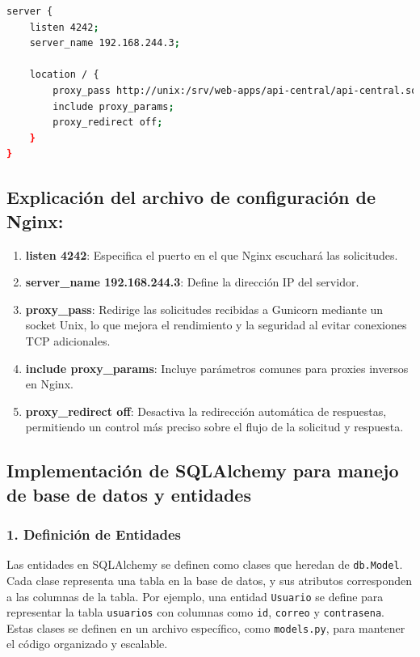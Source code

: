 \begin{lstlisting}[language=bash, caption={Archivo de configuración de Nginx.}]
server {
    listen 4242;
    server_name 192.168.244.3;

    location / {
        proxy_pass http://unix:/srv/web-apps/api-central/api-central.sock;
        include proxy_params;
        proxy_redirect off;
    }
}
\end{lstlisting}

\subsection*{Explicación del archivo de configuración de Nginx:}

\begin{enumerate}[label=\roman*.]
    \item \textbf{listen 4242}: Especifica el puerto en el que Nginx escuchará las solicitudes.
    \item \textbf{server\_name 192.168.244.3}: Define la dirección IP del servidor.
    \item \textbf{proxy\_pass}: Redirige las solicitudes recibidas a Gunicorn mediante un socket Unix, lo que mejora el rendimiento y la seguridad al evitar conexiones TCP adicionales.
    \item \textbf{include proxy\_params}: Incluye parámetros comunes para proxies inversos en Nginx.
    \item \textbf{proxy\_redirect off}: Desactiva la redirección automática de respuestas, permitiendo un control más preciso sobre el flujo de la solicitud y respuesta.
\end{enumerate}

\subsection{Implementación de SQLAlchemy para manejo de base de datos y entidades}


\subsubsection*{1. Definición de Entidades}
Las entidades en SQLAlchemy se definen como clases que heredan de \texttt{db.Model}. Cada clase representa una tabla en la base de datos, y sus atributos corresponden a las columnas de la tabla. Por ejemplo, una entidad \texttt{Usuario} se define para representar la tabla \texttt{usuarios} con columnas como \texttt{id}, \texttt{correo} y \texttt{contrasena}. Estas clases se definen en un archivo específico, como \texttt{models.py}, para mantener el código organizado y escalable.


